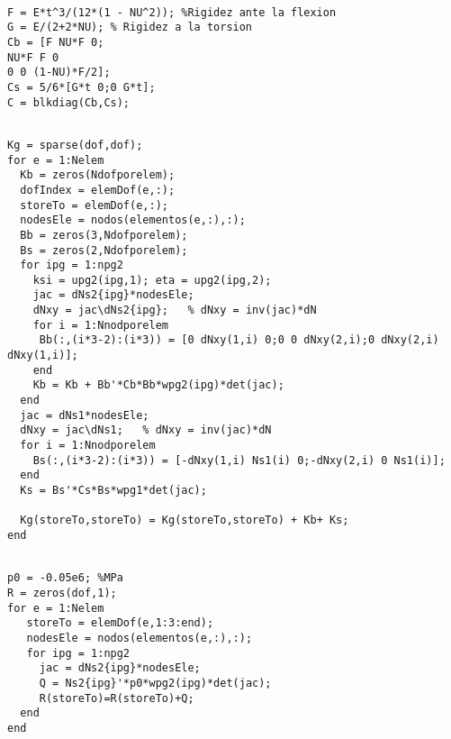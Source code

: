 \begin{code}[Constitutiva]
	\begin{verbatim}
	
F = E*t^3/(12*(1 - NU^2)); %Rigidez ante la flexion
G = E/(2+2*NU); % Rigidez a la torsion
Cb = [F NU*F 0;
NU*F F 0 
0 0 (1-NU)*F/2];
Cs = 5/6*[G*t 0;0 G*t];
C = blkdiag(Cb,Cs);
	\end{verbatim}
\end{code}

\begin{code}
	\begin{verbatim}
	
Kg = sparse(dof,dof);
for e = 1:Nelem
  Kb = zeros(Ndofporelem);
  dofIndex = elemDof(e,:);
  storeTo = elemDof(e,:);
  nodesEle = nodos(elementos(e,:),:);
  Bb = zeros(3,Ndofporelem);
  Bs = zeros(2,Ndofporelem);
  for ipg = 1:npg2
    ksi = upg2(ipg,1); eta = upg2(ipg,2);
    jac = dNs2{ipg}*nodesEle;
    dNxy = jac\dNs2{ipg};   % dNxy = inv(jac)*dN
    for i = 1:Nnodporelem 
     Bb(:,(i*3-2):(i*3)) = [0 dNxy(1,i) 0;0 0 dNxy(2,i);0 dNxy(2,i) dNxy(1,i)];
    end
    Kb = Kb + Bb'*Cb*Bb*wpg2(ipg)*det(jac);
  end
  jac = dNs1*nodesEle;
  dNxy = jac\dNs1;   % dNxy = inv(jac)*dN
  for i = 1:Nnodporelem 
    Bs(:,(i*3-2):(i*3)) = [-dNxy(1,i) Ns1(i) 0;-dNxy(2,i) 0 Ns1(i)];
  end
  Ks = Bs'*Cs*Bs*wpg1*det(jac);

  Kg(storeTo,storeTo) = Kg(storeTo,storeTo) + Kb+ Ks;
end
	\end{verbatim}
\end{code}

\begin{code}[Cargas]
	\begin{verbatim}
	
p0 = -0.05e6; %MPa
R = zeros(dof,1);
for e = 1:Nelem
   storeTo = elemDof(e,1:3:end);
   nodesEle = nodos(elementos(e,:),:);
   for ipg = 1:npg2
     jac = dNs2{ipg}*nodesEle;
     Q = Ns2{ipg}'*p0*wpg2(ipg)*det(jac);
     R(storeTo)=R(storeTo)+Q;
  end
end
	\end{verbatim}
\end{code}

